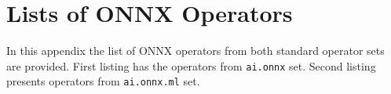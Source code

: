 \documentclass[english, 12pt, a4paper, elec, utf8, online]{aaltothesis}
\begin{document}
\clearpage

\thesisbibliography
{}




\clearpage
\thesisappendix
\section{Lists of ONNX Operators\label{appendix:operatorlist}}
In this appendix the list of ONNX operators from both standard operator sets are provided. First listing has the operators from \texttt{ai.onnx} set. Second listing  presents operators from \texttt{ai.onnx.ml} set.  


\end{document}
